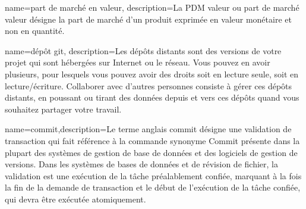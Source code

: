 

{name={part de marché en valeur}, description={La PDM valeur ou part de marché valeur désigne la part de marché d’un produit exprimée en valeur monétaire et non en quantité.}}


{name={dépôt git}, description={Les dépôts distants sont des versions de votre projet qui sont hébergées sur Internet ou le réseau. Vous pouvez en avoir plusieurs, pour lesquels vous pouvez avoir des droits soit en lecture seule, soit en lecture/écriture. Collaborer avec d'autres personnes consiste à gérer ces dépôts distants, en poussant ou tirant des données depuis et vers ces dépôts quand vous souhaitez partager votre travail.}}


{name={commit},description={Le terme anglais commit désigne une validation de transaction qui fait référence à la commande synonyme Commit présente dans la plupart des systèmes de gestion de base de données et des logiciels de gestion de versions. Dans les systèmes de bases de données et de révision de fichier, la validation est une exécution de la tâche préalablement confiée, marquant à la fois la fin de la demande de transaction et le début de l’exécution de la tâche confiée, qui devra être exécutée atomiquement.}}

